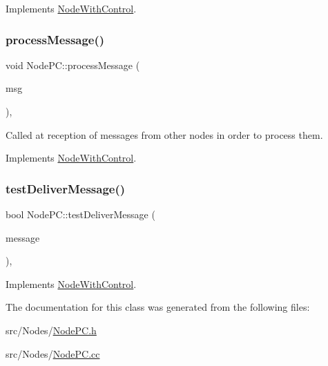 Implements \hyperlink{class_node_with_control_a4f78078272b90937e0746c797443b37d}{Node\+With\+Control}.

\mbox{\label{class_node_p_c_aa5fedc4136104a06e2f1131f1ba16b0e}} 
\subsubsection{\texorpdfstring{process\+Message()}{processMessage()}}
{\footnotesize\ttfamily void Node\+P\+C\+::process\+Message (\begin{DoxyParamCaption}\item[{c\+Message $\ast$}]{msg }\end{DoxyParamCaption})\hspace{0.3cm}{\ttfamily [protected]}, {\ttfamily [virtual]}}



Called at reception of messages from other nodes in order to process them. 



Implements \hyperlink{class_node_with_control_af532082fab76c38d8c50ca90e991f4c3}{Node\+With\+Control}.

\mbox{\label{class_node_p_c_a54731196935596e0c6f094a5a8420134}} 
\subsubsection{\texorpdfstring{test\+Deliver\+Message()}{testDeliverMessage()}}
{\footnotesize\ttfamily bool Node\+P\+C\+::test\+Deliver\+Message (\begin{DoxyParamCaption}\item[{const \hyperlink{structures_8h_a7e7bdc1d2fff8a9436f2f352b2711ed6}{message\+Info} \&}]{message }\end{DoxyParamCaption})\hspace{0.3cm}{\ttfamily [protected]}, {\ttfamily [virtual]}}



Implements \hyperlink{class_node_with_control_a84df0beabbaed80e7da017d592480515}{Node\+With\+Control}.



The documentation for this class was generated from the following files\+:\begin{DoxyCompactItemize}
\item 
src/\+Nodes/\hyperlink{_node_p_c_8h}{Node\+P\+C.\+h}\item 
src/\+Nodes/\hyperlink{_node_p_c_8cc}{Node\+P\+C.\+cc}\end{DoxyCompactItemize}
